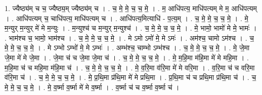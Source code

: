 \documentclass[17pt]{extarticle}
\begin{document}
1. ज्यैष्ठ्य॑म् च च॒ ज्यैष्ठ्य॒म् ज्यैष्ठ्य॑म् च । . च॒ मे॒ मे॒ च॒ च॒ मे॒ । . म॒ आधि॑पत्य॒ माधि॑पत्यम् मे म॒ आधि॑पत्यम् । . आधि॑पत्यम् च॒ चाधि॑पत्य॒ माधि॑पत्यम् च । . आधि॑पत्य॒मित्याधि॑ - प॒त्य॒म् । . च॒ मे॒ मे॒ च॒ च॒ मे॒ । . मे॒ म॒न्युर् म॒न्युर् मे॑ मे म॒न्युः । . म॒न्युश्च॑ च म॒न्युर् म॒न्युश्च॑ । . च॒ मे॒ मे॒ च॒ च॒ मे॒ । . मे॒ भामो॒ भामो॑ मे मे॒ भामः॑ । . भाम॑श्च च॒ भामो॒ भाम॑श्च । . च॒ मे॒ मे॒ च॒ च॒ मे॒ । . मे ऽमो ऽमो॑ मे॒ मे ऽमः॑ । . अम॑श्च॒ चामो ऽम॑श्च । . च॒ मे॒ मे॒ च॒ च॒ मे॒ । . मे ऽम्भो ऽम्भो॑ मे॒ मे ऽम्भः॑ । . अम्भ॑श्च॒ चाम्भो ऽम्भ॑श्च । . च॒ मे॒ मे॒ च॒ च॒ मे॒ । . मे॒ जे॒मा जे॒मा मे॑ मे जे॒मा । . जे॒मा च॑ च जे॒मा जे॒मा च॑ । . च॒ मे॒ मे॒ च॒ च॒ मे॒ । . मे॒ म॒हि॒मा म॑हि॒मा मे॑ मे महि॒मा । . म॒हि॒मा च॑ च महि॒मा म॑हि॒मा च॑ । . च॒ मे॒ मे॒ च॒ च॒ मे॒ । . मे॒ व॒रि॒मा व॑रि॒मा मे॑ मे वरि॒मा । . व॒रि॒मा च॑ च वरि॒मा व॑रि॒मा च॑ । . च॒ मे॒ मे॒ च॒ च॒ मे॒ । . मे॒ प्र॒थि॒मा प्र॑थि॒मा मे॑ मे प्रथि॒मा । . प्र॒थि॒मा च॑ च प्रथि॒मा प्र॑थि॒मा च॑ । . च॒ मे॒ मे॒ च॒ च॒ मे॒ । . मे॒ व॒र्ष्मा व॒र्ष्मा मे॑ मे व॒र्ष्मा । . व॒र्ष्मा च॑ च व॒र्ष्मा व॒र्ष्मा च॑ । \newline
\end{document}
